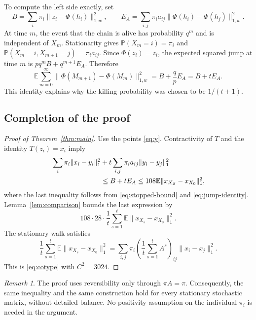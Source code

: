 \documentclass[11pt]{article}
\theoremstyle{definition}
\theoremstyle{remark}
\newtheorem{remark}[theorem]{Remark}
\numberwithin{equation}{section}
\newcommand{\E}{\mathbb E}
\newcommand{\Prob}{\mathbb P}
\begin{document}
To compute the left side exactly, set
\[
 B=\sum_i\pi_i\|z_i-\Phi(h_i)\|_{1,w}^2,
 \qquad
 E_A=\sum_{i,j}\pi_i a_{ij}
             \|\Phi(h_i)-\Phi(h_j)\|_{1,w}^2.
\]
At time $m$, the event that the chain is alive has probability
$q^m$ and is independent of $X_m$. Stationarity gives
$\Prob(X_m=i)=\pi_i$ and
$\Prob(X_m=i,X_{m+1}=j)=\pi_i a_{ij}$.
Since $\Phi(z_i)=z_i$, the expected squared jump at time $m$
is $pq^m B+q^{m+1}E_A$. Therefore
\begin{equation}\label{eq:jump-identity}
 \E\sum_{m=0}^\infty
 \|\Phi(M_{m+1})-\Phi(M_m)\|_{1,w}^2
 =B+\frac qp E_A=B+tE_A.
\end{equation}
This identity explains why the killing probability was chosen
to be $1/(t+1)$.

\subsection{Completion of the proof}
\begin{proof}[Proof of Theorem~\ref{thm:main}]
Use the points \eqref{eq:y}. Contractivity of $T$ and the
identity $T(z_i)=x_i$ imply
\begin{align*}
 &\sum_i\pi_i\|x_i-y_i\|_1^2
       +t\sum_{i,j}\pi_i a_{ij}\|y_i-y_j\|_1^2\\
 &\hspace{25mm}\leq B+tE_A
 \leq108\E\|x_{X_S}-x_{X_0}\|_1^2,
\end{align*}
where the last inequality follows from
\eqref{eq:stopped-bound} and \eqref{eq:jump-identity}.
Lemma~\ref{lem:comparison} bounds the last expression by
\[
 108\cdot28\cdot\frac1t\sum_{s=1}^t
                  \E\|x_{X_s}-x_{X_0}\|_1^2.
\]
The stationary walk satisfies
\[
 \frac1t\sum_{s=1}^t\E\|x_{X_s}-x_{X_0}\|_1^2
 =\sum_{i,j}\pi_i\left(\frac1t\sum_{s=1}^t A^s\right)_{ij}
                  \|x_i-x_j\|_1^2.
\]
This is \eqref{eq:cotype} with $C^2=3024$.
\end{proof}

\begin{remark}\label{rem:stationary}
The proof uses reversibility only through $\pi A=\pi$.
Consequently, the same inequality and the same construction
hold for every stationary stochastic matrix, without detailed
balance. No positivity assumption on the individual $\pi_i$
is needed in the argument.
\end{remark}
\end{document}
